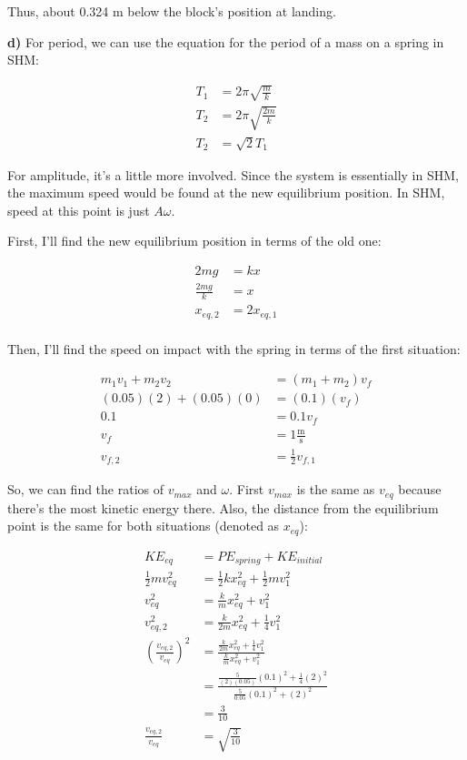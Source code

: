 \documentclass{article}
\begin{document}
Thus, about 0.324 m below the block's position at landing.

\vspace{1cm}

\large\textbf{d)} For period, we can use the equation for the period of a mass on a spring in SHM:

\begin{align*}
    T_1 &= 2\pi\sqrt{\frac{m}{k}} \\
    T_2 &= 2\pi\sqrt{\frac{2m}{k}} \\
    T_2 &= \sqrt{2}T_1
\end{align*}

For amplitude, it's a little more involved. Since the system is essentially in SHM, the maximum speed would be found at the new equilibrium position. In SHM, speed at this point is just $A\omega$.

First, I'll find the new equilibrium position in terms of the old one:

\begin{align*}
    2mg &= kx \\
    \frac{2mg}{k} &= x \\
    x_{eq,2} &= 2x_{eq,1} \\
\end{align*}

Then, I'll find the speed on impact with the spring in terms of the first situation:

\begin{align*}
    m_1v_1+m_2v_2 &= (m_1+m_2)v_f \\
    (0.05)(2) + (0.05)(0) &= (0.1)(v_f) \\
    0.1 &= 0.1v_f \\
    v_f &= 1 \frac{\text{m}}{\text{s}} \\
    v_{f,2} &= \frac{1}{2}v_{f,1} 
\end{align*}

So, we can find the ratios of $v_{max}$ and ${\omega}$. First $v_{max}$ is the same as $v_{eq}$ because there's the most kinetic energy there. Also, the distance from the equilibrium point is the same for both situations (denoted as $x_{eq}$):

\begin{align*}
    KE_{eq} &= PE_{spring} + KE_{initial} \\
    \frac{1}{2}mv_{eq}^2 &= \frac{1}{2}kx_{eq}^2 + \frac{1}{2}mv_1^2 \\
    v_{eq}^2 &= \frac{k}{m} x_{eq}^2 + v_1^2 \\
    v_{eq,2}^2 &= \frac{k}{2m} x_{eq}^2 + \frac{1}{4}v_1^2 \\
    \left(\frac{v_{eq,2}}{v_{eq}}\right)^2 &= \frac{\frac{k}{2m} x_{eq}^2 + \frac{1}{4}v_1^2}{\frac{k}{m} x_{eq}^2 + v_1^2} \\
    &= \frac{\frac{5}{(2)(0.05)} (0.1)^2 + \frac{1}{4}(2)^2}{\frac{5}{0.05} (0.1)^2 + (2)^2} \\
    &= \frac{3}{10} \\
    \frac{v_{eq,2}}{v_{eq}} &= \sqrt{\frac{3}{10}}
\end{align*}
\end{document}
